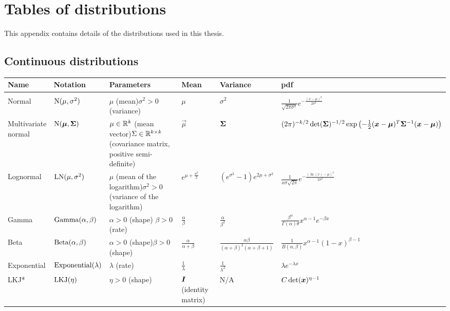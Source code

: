 \documentclass[thesis.tex]{subfiles}
\begin{document}
\chapter{Tables of distributions} \label{distributions}

This appendix contains details of the distributions used in this thesis.

\begin{landscape}
\section{Continuous distributions}
\begin{tabular}{llp{3.5cm}lll}
Name & Notation & Parameters & Mean & Variance & pdf\\
\hline \\
Normal & $\operatorname{N}(\mu, \sigma^2)$ & $\mu$ (mean)\newline $\sigma^2 > 0$ (variance) & $\mu$ & $\sigma^2$ & $\frac{1}{\sqrt{2\pi\sigma^2}}e^{-\frac{(x-\mu)^2}{2\sigma^2}}$ \\
\makecell{Multivariate \\ normal} & $\operatorname{N}(\bm{\mu}, \bm{\Sigma})$ & $\mu \in \mathbb{R}^k$ (mean vector)\newline $\Sigma \in \mathbb{R}^{k \times k}$ (covariance matrix, positive semi-definite) & $\vec{\mu}$ & $\bm{\Sigma}$ & $(2 \pi)^{-k / 2} \operatorname{det}(\bm{\Sigma})^{-1 / 2} \exp \left(-\frac{1}{2}(\bm{x}-\bm{\mu})^T \bm{\Sigma}^{-1}(\bm{x}-\bm{\mu})\right)$ \\
Lognormal & $\operatorname{LN}(\mu, \sigma^2)$ & $\mu$ (mean of the logarithm)\newline $\sigma^2 > 0$ (variance of the logarithm) & $e^{\mu + \frac{\sigma^2}{2}}$ & $(e^{\sigma^2} - 1)e^{2\mu + \sigma^2}$ & $\frac{1}{x\sigma\sqrt{2\pi}}e^{-\frac{(\ln(x)-\mu)^2}{2\sigma^2}}$ \\
Gamma & $\operatorname{Gamma}(\alpha, \beta)$ & $\alpha > 0$ (shape) \newline $\beta > 0$ (rate) & $\frac{\alpha}{\beta}$ & $\frac{\alpha}{\beta^2}$ & $\frac{\beta^\alpha}{\Gamma(\alpha)\theta}x^{\alpha-1}e^{-\beta x}$ \\
Beta & $\operatorname{Beta}(\alpha, \beta)$ & $\alpha > 0$ (shape)\newline $\beta > 0$ (shape) & $\frac{\alpha}{\alpha+\beta}$ & $\frac{\alpha\beta}{(\alpha+\beta)^2(\alpha+\beta+1)}$ & $\frac{1}{B(\alpha,\beta)}x^{\alpha-1}(1-x)^{\beta-1}$ \\
Exponential & $\operatorname{Exponential}(\lambda)$ & $\lambda$ (rate) & $\frac{1}{\lambda}$ & $\frac{1}{\lambda^2}$ & $\lambda e^{-\lambda x}$ \\
LKJ* & $\operatorname{LKJ}(\eta)$ & $\eta > 0$ (shape) & $\bm{I}$ (identity matrix) & N/A & $C \det(\bm{x})^{\eta-1}$ \\
\end{tabular}


\end{landscape}
\end{document}
